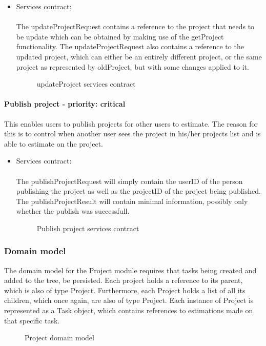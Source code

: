 \begin{itemize}
	\item Services contract:\\ \\
	The updateProjectRequest contains a reference to the project that needs to be update which can be obtained by making use of the getProject functionality. The updateProjectRequest also contains a reference to the updated project, which can either be an entirely different project, or the same project as represented by oldProject, but with some changes applied to it.
	\begin{figure}[H]
    	\centering
    	\caption{updateProject services contract}
    	\label{fig:updateProject_services_contract}
   	\end{figure}
\end{itemize}

\paragraph{Publish project - priority: critical}
This enables users to publish projects for other users to estimate. The reason for this is to control when another user sees the project in his/her projects list and is able to estimate on the project.

\begin{itemize}
	\item Services contract:\\ \\
	The publishProjectRequest will simply contain the userID of the person publishing the project as well as the projectID of the project being published. The publishProjectResult will contain minimal information, possibly only whether the publish was successfull.
	\begin{figure}[H]
    	\centering
    	\caption{Publish project services contract}
    	\label{fig:publishProject}
   	\end{figure}
\end{itemize}

\subsubsection{Domain model}
The domain model for the Project module requires that tasks being created and added to the tree, be persisted. Each project holds a reference to its parent, which is also of type Project. Furthermore, each Project holds a list of all its children, which once again, are also of type Project. Each instance of Project is represented as a Task object, which contains references to estimations made on that specific task.
\begin{figure}[H]
	\centering
	\caption{Project domain model}
	\label{fig:Project_domain_model}
\end{figure}

